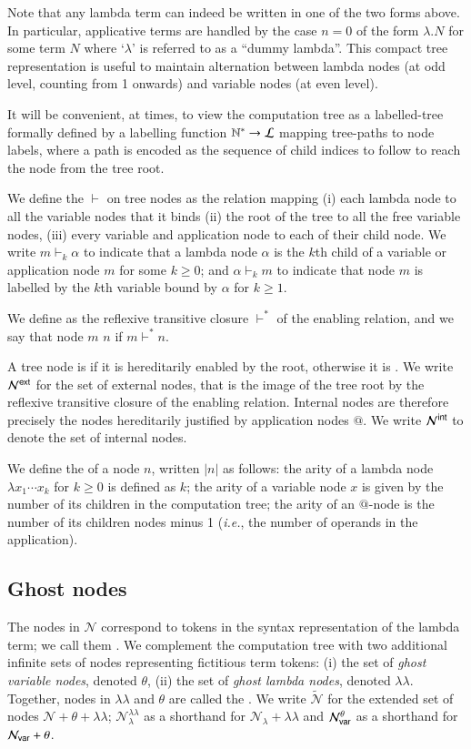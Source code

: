 \documentclass{elsarticle}
\makeatletter
\theoremstyle{plain}
\theoremstyle{definition}
\theoremstyle{remark}
\newcommand\Nodes{\mathcal{N}}%
\newcommand\NodesVar{\Nodes_{\sf var}}%
\newcommand\NodesLmd{\Nodes_\lambda}%
\newcommand\ExtendedNodes{\tilde{\Nodes}}
\newcommand{\ghostlmd}{{\lambda\!\!\lambda}}
\newcommand{\ghostvar}{\theta}
\newcommand\ImNodesVar{\NodesVar^\ghostvar}
\newcommand\ImNodesLmd{\NodesLmd^\ghostlmd}
\newcommand{\enables}{\vdash} %
\newcommand{\ExtNodes}{\Nodes^{\sf ext}}
\newcommand{\IntNodes}{\Nodes^{\sf int}}
\renewcommand\ie{{\it i.e.\@\xspace}}
\makeatother
\begin{document}
Note that any lambda term can indeed be written in one of the two forms above. In particular, applicative terms are handled by the case $n=0$ of the form $\lambda . N$ for some term $N$ where `$\lambda$' is referred to as a ``dummy lambda''. This compact tree representation is useful to maintain alternation between lambda nodes (at odd level, counting from 1 onwards) and variable nodes (at even level).

It will be convenient, at times, to view the computation tree as a labelled-tree formally defined
by a labelling function $\mathbb{N}^* \rightarrow \mathcal{L}$ mapping tree-paths to node labels, where a path is encoded as the sequence of child indices to follow to reach the node from the tree root.

We define the  $\enables$ on tree nodes as the relation mapping (i) each lambda node to all the variable nodes that it binds (ii) the root of the tree to all the free variable nodes, (iii) every variable and application node to each of their child node. We write $m \enables_k \alpha$ to indicate that a lambda node $\alpha$ is the $k$th child of a variable or application node $m$ for some $k\geq0$; and $\alpha \enables_k m$ to indicate that node $m$ is labelled by the $k$th variable bound by $\alpha$ for $k\geq1$.

We define  as the reflexive transitive closure $\enables^*$ of the enabling relation, and we say that node $m$  $n$ if $m \enables^* n$.

A tree node is  if it is hereditarily enabled by the root, otherwise it is . We write $\ExtNodes$ for the set of external nodes, that is the image of the tree root by the reflexive transitive closure of the enabling relation. Internal nodes are therefore precisely the nodes hereditarily justified by application nodes $@$. We write $\IntNodes$ to denote the set of internal nodes.

We define the  of a node $n$, written $|n|$ as follows: the arity of a lambda node $\lambda x_1 \cdots x_k$ for $k\geq 0$ is defined as $k$; the arity of a variable node $x$ is given by the number of its children in the computation tree; the arity of an $@$-node is the number of its children nodes minus 1 (\ie, the number of operands in the application).

\subsection{Ghost nodes}
The nodes in $\Nodes$ correspond to tokens in the syntax representation of the lambda term; we call them . We complement the computation tree with two additional infinite sets of nodes representing fictitious term tokens:
(i) the set of \emph{ghost variable nodes}, denoted $\ghostvar$, (ii) the set of \emph{ghost lambda nodes}, denoted $\ghostlmd$. Together, nodes in $\ghostlmd$ and $\ghostvar$ are called the . We write $\ExtendedNodes$ for the extended set of nodes $\Nodes + \ghostvar + \ghostlmd$; $\ImNodesLmd$ as a shorthand for $\NodesLmd + \ghostlmd$ and $\ImNodesVar$ as a shorthand for $\NodesVar + \ghostvar$.
\end{document}
